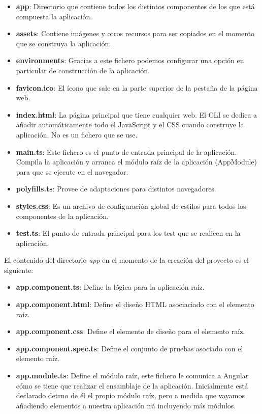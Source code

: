 \begin{itemize}
    \item \textbf{app}: Directorio que contiene todos los distintos componentes de los que está compuesta la aplicación.
    \item \textbf{assets}: Contiene imágenes y otros recursos para ser copiados en el momento que se construya la aplicación.
    \item \textbf{environments}: Gracias a este fichero podemos configurar una opción en particular de construcción de la aplicación.
    \item \textbf{favicon.ico}: El ícono que sale en la parte superior de la pestaña de la página web.
    \item \textbf{index.html}: La página principal que tiene cualquier web. El CLI se dedica a añadir automáticamente todo el JavaScript y el CSS cuando construye la aplicación. No es un fichero que se use.
    \item \textbf{main.ts}: Este fichero es el punto de entrada principal de la aplicación. Compila la aplicación y arranca el módulo raíz de la aplicación (AppModule) para que se ejecute en el navegador.
    \item \textbf{polyfills.ts}: Provee de adaptaciones para distintos navegadores.
    \item \textbf{styles.css}: Es un archivo de configuración global de estilos para todos los componentes de la aplicación.
    \item \textbf{test.ts}: El punto de entrada principal para los test que se realicen en la aplicación.
\end{itemize}

El contenido del directorio \textit{app} en el momento de la creación del proyecto es el siguiente:

\begin{itemize}
    \item \textbf{app.component.ts}: Define la lógica para la aplicación raíz.
    \item \textbf{app.component.html}: Define el diseño HTML asociaciado con el elemento raíz.
    \item \textbf{app.component.css}: Define el elemento de diseño para el elemento raíz.
    \item \textbf{app.component.spec.ts}: Define el conjunto de pruebas asociado con el elemento raíz.
    \item \textbf{app.module.ts}: Define el módulo raíz, este fichero le comunica a Angular cómo se tiene que realizar el ensamblaje de la aplicación. Inicialmente está declarado detrno de él el propio módulo raíz, pero a medida que vayamos añadiendo elementos a nuestra aplicación irá incluyendo más módulos.
\end{itemize}

